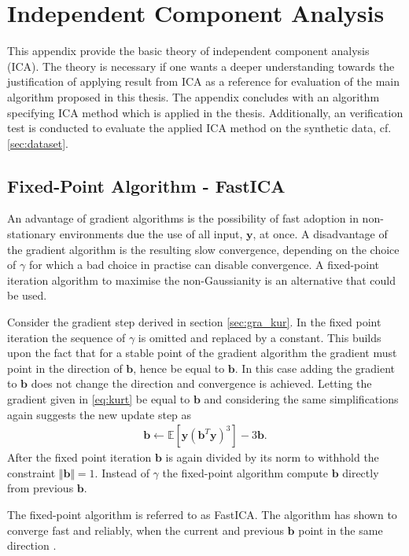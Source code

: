 \chapter{Independent Component Analysis}\label{app:ICA}
This appendix provide the basic theory of independent component analysis (ICA). The theory is necessary if one wants a deeper understanding towards the justification of applying result from ICA as a reference for evaluation of the main algorithm proposed in this thesis.   
The appendix concludes with an algorithm specifying ICA method which is applied in the thesis. Additionally, an verification test is conducted to evaluate the applied ICA method on the synthetic data, cf. \ref{sec:dataset}.   
 

\section{Fixed-Point Algorithm - FastICA}
An advantage of gradient algorithms is the possibility of fast adoption in non-stationary environments due the use of all input, $\textbf{y}$, at once. A disadvantage of the gradient algorithm is the resulting slow convergence, depending on the choice of $\gamma$ for which a bad choice in practise can disable convergence. A fixed-point iteration algorithm to maximise the non-Gaussianity is an alternative that could be used.

Consider the gradient step derived in section \ref{sec:gra_kur}.
In the fixed point iteration the sequence of $\gamma$ is omitted and replaced by a constant. This builds upon the fact that for a stable point of the gradient algorithm the gradient must point in the direction of $\textbf{b}$, hence be equal to $\textbf{b}$. In this case adding the gradient to $\textbf{b}$ does not change the direction and convergence is achieved.   
Letting the gradient given in \eqref{eq:kurt} be equal to $\mathbf{b}$ and  considering the same simplifications again
suggests the new update step as \cite[p. 179]{ICA}
\begin{align*}
\mathbf{b} \gets \mathbb{E}[\mathbf{y}(\textbf{b}^T \textbf{y})^3] - 3 \mathbf{b}.
\end{align*}
After the fixed point iteration $\textbf{b}$ is again divided by its norm to withhold the constraint $\Vert \textbf{b} \Vert = 1$.   
Instead of $\gamma$ the fixed-point algorithm compute $\mathbf{b}$ directly from previous $\mathbf{b}$.

The fixed-point algorithm is referred to as FastICA. The algorithm has shown to converge fast and reliably, when the current and previous $\mathbf{b}$ point in the same direction \cite[p. 179]{ICA}. 

